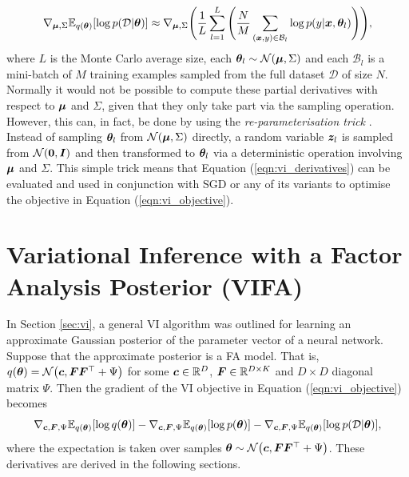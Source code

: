\documentclass[10pt]{article} %
\begin{document}
\begin{equation}\label{eqn:vi_derivatives}
	 \nabla_{{\bm{\mu}}, \Sigma} \mathbb{E}_{q({\bm{\theta}})} [\log p(\mathcal{D} | {\bm{\theta}})]
	\approx \nabla_{{\bm{\mu}}, \Sigma} \Bigg(\frac{1}{L}  \sum_{l=1}^{L} \Bigg( \frac{N}{M} \sum_{({\bm{x}}, y) \in \mathcal{B}_l} \log p(y | {\bm{x}}, {\bm{\theta}}_l) \Bigg)\Bigg),
\end{equation}
where $L$ is the Monte Carlo average size, each ${\bm{\theta}}_l \sim \mathcal{N}({\bm{\mu}}, \Sigma)$ and each $\mathcal{B}_l$ is a mini-batch of $M$ training examples sampled from the full dataset $\mathcal{D}$ of size $N$. Normally it would not be possible to compute these partial derivatives with respect to ${\bm{\mu}}$ and $\Sigma$, given that they only take part via the sampling operation. However, this can, in fact, be done by using the \emph{re-parameterisation trick} \citep{goodfellow2016}. Instead of sampling ${\bm{\theta}}_l$ from $\mathcal{N}({\bm{\mu}}, \Sigma)$ directly, a random variable ${\bm{z}}_l$ is sampled from $\mathcal{N}(\mathbf{0}, {\bm{I}})$ and then transformed to ${\bm{\theta}}_l$ via a deterministic operation involving ${\bm{\mu}}$ and $\Sigma$. This simple trick means that Equation (\ref{eqn:vi_derivatives}) can be evaluated and used in conjunction with SGD or any of its variants to optimise the objective in Equation (\ref{eqn:vi_objective}).

\section{Variational Inference with a Factor Analysis Posterior (VIFA)}
\label{sec: Variational Inference with a Factor Analysis Posterior (VIFA)}

In Section \ref{sec:vi}, a general VI algorithm was outlined for learning an approximate Gaussian posterior of the parameter vector of a neural network. Suppose that the approximate posterior is a FA model. That is, $q({\bm{\theta}}) = \mathcal{N}\big({\bm{c}}, {\bm{F}} {\bm{F}}^{\top} + \Psi\big)$ for some ${\bm{c}} \in \mathbb{R}^D$, ${\bm{F}} \in \mathbb{R}^{D \times K}$ and $D \times D$ diagonal matrix $\Psi$. Then the gradient of the VI objective in Equation (\ref{eqn:vi_objective}) becomes 
\begin{equation}\label{eqn:vi_fa_derivatives}
	\nabla_{{\bm{c}}, {\bm{F}}, \Psi} \mathbb{E}_{q({\bm{\theta}})} [\log q({\bm{\theta}})]
	- \nabla_{{\bm{c}}, {\bm{F}}, \Psi} \mathbb{E}_{q({\bm{\theta}})} [\log p({\bm{\theta}})]
	-  \nabla_{{\bm{c}}, {\bm{F}}, \Psi} \mathbb{E}_{q({\bm{\theta}})} [\log p(\mathcal{D} | {\bm{\theta}})],
\end{equation}
where the expectation is taken over samples ${\bm{\theta}} \sim \mathcal{N}\big({\bm{c}}, {\bm{F}} {\bm{F}}^{\top} + \Psi\big)$. These derivatives are derived in the following sections. 
\end{document}
